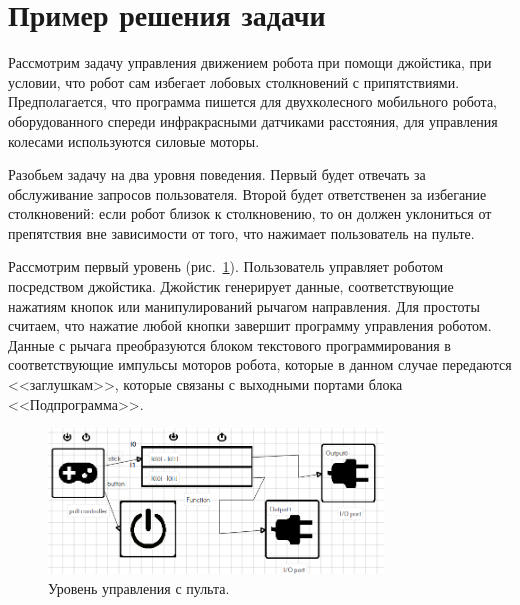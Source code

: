 \documentclass[conference]{IEEEtran}
\begin{document}
\section{Пример решения задачи}

Рассмотрим задачу управления движением робота при помощи джойстика, при условии, что робот сам избегает лобовых столкновений с припятствиями. Предполагается, что программа пишется для двухколесного мобильного робота, оборудованного спереди инфракрасными датчиками расстояния, для управления колесами используются силовые моторы.

Разобьем задачу на два уровня поведения. Первый будет отвечать за обслуживание запросов пользователя. Второй будет ответственен за избегание столкновений: если робот близок к столкновению, то он должен уклониться от препятствия вне зависимости от того, что нажимает пользователь на пульте. 

Рассмотрим первый уровень (рис.~\ref{image:layer1}). Пользователь управляет роботом посредством джойстика. Джойстик генерирует данные, соответствующие нажатиям кнопок или манипулирований рычагом направления. Для простоты считаем, что нажатие любой кнопки завершит программу управления роботом. Данные с рычага преобразуются блоком текстового программирования в соответствующие импульсы моторов робота, которые в данном случае передаются <<заглушкам>>, которые связаны с выходными портами блока <<Подпрограмма>>. 
\begin{figure}[ht]
	\centering
	\includegraphics[width=3.5in]{pultLayer.png}
	\caption{Уровень управления с пульта.}
	\label{image:layer1}
\end{figure}
\end{document}
